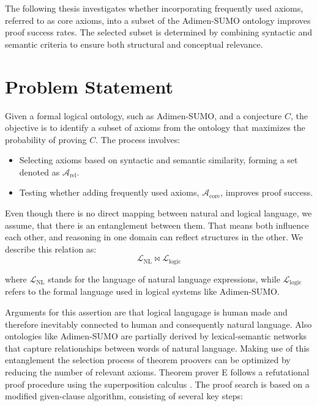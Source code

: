\documentclass[english,version-2020-11]{uzl-thesis}
\begin{document}
The following thesis investigates whether incorporating frequently used axioms, referred to as core axioms, into a subset of the Adimen-SUMO ontology improves proof success rates. The selected subset is determined by combining syntactic and semantic criteria to ensure both structural and conceptual relevance.


\section{Problem Statement}
Given a formal logical ontology, such as Adimen-SUMO, and a conjecture \( C \), the objective is to identify a subset of axioms from the ontology that maximizes the probability of proving \( C \). The process involves:
\begin{itemize}
    \item Selecting axioms based on syntactic and semantic similarity, forming a set denoted as \( \mathcal{A}_{\text{rel}} \).
    \item Testing whether adding frequently used axioms, \( \mathcal{A}_{\text{core}} \), improves proof success.
\end{itemize}

Even though there is no direct mapping between natural and logical language, we assume, that there is an entanglement between them. That means both influence each other, and reasoning in one domain can reflect structures in the other. We describe this relation as:\\
\begin{equation}
    \mathcal{L}_{\text{NL}} \bowtie \mathcal{L}_{\text{logic}}
\end{equation}

where \( \mathcal{L}_{\text{NL}} \) stands for the language of natural language expressions, while \( \mathcal{L}_{\text{logic}} \) refers to the formal language used in logical systems like Adimen-SUMO.

Arguments for this assertion are that logical langugage is human made and therefore inevitably connected to human and consequently natural language.
Also ontologies like Adimen-SUMO are partially derived by lexical-semantic networks that capture relationships between words of natural language.
Making use of this entanglement the selection process of theorem proovers can be optimized by reducing the number of relevant axioms.
Theorem prover E follows a refutational proof procedure using the superposition calculus \cite{Schulz2019}. The proof search is based on a modified given-clause algorithm, consisting of several key steps:
\end{document}
